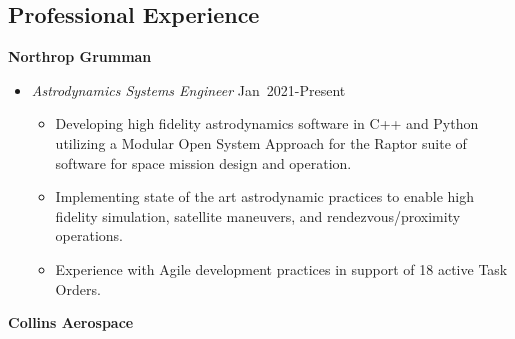 \subsection*{Professional Experience}
{}

\textbf{Northrop Grumman}

\begin{itemize}
    \item[] \textit{Astrodynamics Systems Engineer} \hfill {Jan~2021-Present}
        \begin{itemize}
            \item Developing high fidelity astrodynamics software in C++ and Python utilizing a Modular Open System Approach for the Raptor suite of software for space mission design and operation. 
            \item Implementing state of the art astrodynamic practices to enable high fidelity simulation, satellite maneuvers, and rendezvous/proximity operations. 
            \item Experience with Agile development practices in support of 18 active Task Orders. 
        \end{itemize}
\end{itemize}
\textbf{Collins Aerospace}

